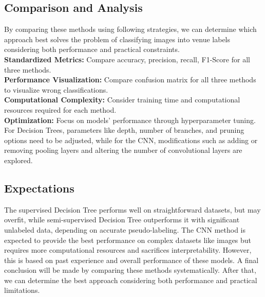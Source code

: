 \documentclass[10pt,twocolumn,letterpaper]{article}
\begin{document}
\subsection{Comparison and Analysis}
\hspace{0.5cm} By comparing these methods using following strategies, we can determine which approach best solves the problem of classifying images into venue labels considering both performance and practical constraints.\\
\indent\textbf{Standardized Metrics:} Compare accuracy, precision, recall, F1-Score for all three methods.\\
\indent\textbf{Performance Visualization:} Compare confusion matrix for all three methods to visualize wrong classifications.\\
\indent\textbf{Computational Complexity:} Consider training time and computational resources required for each method.\\
\indent\textbf{Optimization:} Focus on models' performance through hyperparameter tuning. For Decision Trees, parameters like depth, number of branches, and pruning options need to be adjusted, while for the CNN, modifications such as adding or removing pooling layers and altering the number of convolutional layers are explored.


\subsection{Expectations}
\hspace{0.5cm} The supervised Decision Tree performs well on straightforward datasets, but may overfit, while semi-supervised Decision Tree outperforms it with significant unlabeled data, depending on accurate pseudo-labeling. The CNN method is expected to provide the best performance on complex datasets like images but requires more computational resources and sacrifices interpretability. However, this is based on past experience and overall performance of these models. A final conclusion will be made by comparing these methods systematically. After that, we can determine the best approach considering both performance and practical limitations.

\newpage

\label{sec:formatting}





\end{document}

